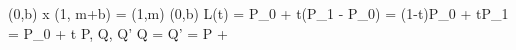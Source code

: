 (0,b)
x
(1, m+b)
 = (1,m)
(0,b)
L(t) = P_0 + t(P_1 - P_0) = (1-t)P_0 + tP_1 = P_0 + t
P, Q, 
Q'
Q
 = \cdot {}
Q' = P + 